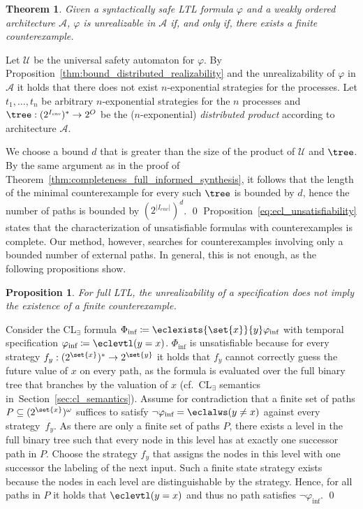 \documentclass{LMCS}
\theoremstyle{plain}\newtheorem{theorem}[thm]{Theorem}
\theoremstyle{plain}\newtheorem{lemma}[thm]{Lemma}
\theoremstyle{plain}\newtheorem{proposition}[thm]{Proposition}
\theoremstyle{plain}\newtheorem{corollary}[thm]{Corollary}
\theoremstyle{definition}\newtheorem{definition}{Definition}[section]
\begin{document}
\begin{theorem}
  Given a syntactically safe LTL formula $\varphi$ and a weakly ordered architecture $\mathcal{A}$, $\varphi$ is unrealizable in $\mathcal{A}$ if, and only if, there exists a finite counterexample.
\end{theorem}
\proof
   Let $\mathcal{U}$ be the universal safety automaton for $\varphi$.
  By Proposition~\ref{thm:bound_distributed_realizability} and the unrealizability of $\varphi$ in $\mathcal{A}$ it holds that there does not exist $n$-exponential strategies for the processes.
  Let $t_1,\dots,t_n$ be arbitrary $n$-exponential strategies for the $n$ processes and $\tree : (2^{I_\mathit{env}})^* \rightarrow 2^O$ be the ($n$-exponential) \emph{distributed product} according to architecture $\mathcal{A}$.
  
  We choose a bound $d$ that is greater than the size of the product of $\mathcal{U}$ and $\tree$.
  By the same argument as in the proof of Theorem~\ref{thm:completeness_full_informed_synthesis}, it follows that the length of the minimal counterexample for every such $\tree$ is bounded by $d$, hence the number of paths is bounded by $(2^{|I_\mathit{env}|})^d$.
\qed\noindent
Proposition~\ref{eq:ecl_unsatisfiability} states that the characterization of unsatisfiable formulas with counterexamples is complete.
Our method, however, searches for counterexamples involving only a bounded number of external paths. In general, this is not enough, as the following propositions show.\begin{proposition}
  For full LTL, the unrealizability of a specification does not imply the existence of a finite counterexample.
\end{proposition}
\proof
Consider the CL$_\exists$ formula $\Phi_\text{inf} \coloneqq \eclexists{\set{x}}{y} \varphi_\text{inf}$ with temporal specification $\varphi_\text{inf} \coloneqq \eclevtl (y = x)$.
$\Phi_\text{inf}$ is unsatisfiable because for every strategy $f_y : (2^\set{x})^* \rightarrow 2^\set{y}$ it holds that $f_y$ cannot correctly guess the future value of $x$ on every path, as the formula is evaluated over the full binary tree that branches by the valuation of $x$ (cf.\ CL$_\exists$ semantics in~Section~\ref{sec:cl_semantics}).
Assume for contradiction that a finite set of paths $P \subseteq (2^\set{x})^\omega$ suffices to satisfy $\neg\varphi_\text{inf} = \eclalws (y \neq x)$ against every strategy~$f_y$.
As there are only a finite set of paths $P$, there exists a level in the full binary tree such that every node in this level has at exactly one successor path in $P$.
Choose the strategy $f_y$ that assigns the nodes in this level with one successor the labeling of the next input.
Such a finite state strategy exists because the nodes in each level are distinguishable by the strategy.
Hence, for all paths in $P$ it holds that $\eclevtl (y = x)$ and thus no path satisfies $\neg\varphi_\text{inf}$.
\qed
\end{document}
